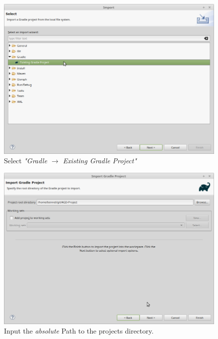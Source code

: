 \begin{figure}[H]
	\includegraphics[width=\textwidth]{setup-parts/pictures/eclipse-import-3.png}
	\caption{Select \textit{"Gradle $\rightarrow$ Existing Gradle Project"}}
\end{figure}

\begin{figure}
	\includegraphics[width=\textwidth]{setup-parts/pictures/eclipse-import-4b.png}
	\caption{Input the \textit{absolute} Path to the projects directory.}
\end{figure}

